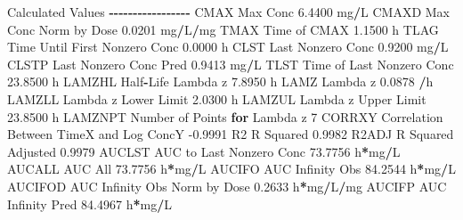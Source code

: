 \documentclass[
  10pt,
]{krantz}
\makeatletter
\newenvironment{Shaded}{\begin{snugshade}}{\end{snugshade}}
\newcommand{\ControlFlowTok}[1]{\textcolor[rgb]{0.13,0.29,0.53}{\textbf{#1}}}
\newcommand{\DecValTok}[1]{\textcolor[rgb]{0.00,0.00,0.81}{#1}}
\newcommand{\FloatTok}[1]{\textcolor[rgb]{0.00,0.00,0.81}{#1}}
\newcommand{\NormalTok}[1]{#1}
\newcommand{\OperatorTok}[1]{\textcolor[rgb]{0.81,0.36,0.00}{\textbf{#1}}}
\newenvironment{kframe}{%
\medskip{}
\setlength{\fboxsep}{.8em}
 \def\at@end@of@kframe{}%
 \ifinner\ifhmode%
  \def\at@end@of@kframe{\end{minipage}}%
  \begin{minipage}{\columnwidth}%
 \fi\fi%
 \def\FrameCommand##1{\hskip\@totalleftmargin \hskip-\fboxsep
 \colorbox{shadecolor}{##1}\hskip-\fboxsep
     \hskip-\linewidth \hskip-\@totalleftmargin \hskip\columnwidth}%
 \MakeFramed {\advance\hsize-\width
   \@totalleftmargin\z@ \linewidth\hsize
   \@setminipage}}%
 {\par\unskip\endMakeFramed%
 \at@end@of@kframe}
\renewenvironment{Shaded}{\begin{kframe}}{\end{kframe}}
\makeatother
\begin{document}
\begin{Shaded}
\begin{Highlighting}[]
\NormalTok{Calculated Values}
\OperatorTok{{-}{-}{-}{-}{-}{-}{-}{-}{-}{-}{-}{-}{-}{-}{-}{-}{-}}
\NormalTok{CMAX       Max Conc                                        }\FloatTok{6.4400}\NormalTok{ mg}\OperatorTok{/}\NormalTok{L}
\NormalTok{CMAXD      Max Conc Norm by Dose                           }\FloatTok{0.0201}\NormalTok{ mg}\OperatorTok{/}\NormalTok{L}\OperatorTok{/}\NormalTok{mg}
\NormalTok{TMAX       Time of CMAX                                    }\FloatTok{1.1500}\NormalTok{ h}
\NormalTok{TLAG       Time Until First Nonzero Conc                   }\FloatTok{0.0000}\NormalTok{ h}
\NormalTok{CLST       Last Nonzero Conc                               }\FloatTok{0.9200}\NormalTok{ mg}\OperatorTok{/}\NormalTok{L}
\NormalTok{CLSTP      Last Nonzero Conc Pred                          }\FloatTok{0.9413}\NormalTok{ mg}\OperatorTok{/}\NormalTok{L}
\NormalTok{TLST       Time of Last Nonzero Conc                      }\FloatTok{23.8500}\NormalTok{ h}
\NormalTok{LAMZHL     Half}\OperatorTok{{-}}\NormalTok{Life Lambda z                              }\FloatTok{7.8950}\NormalTok{ h}
\NormalTok{LAMZ       Lambda z                                        }\FloatTok{0.0878} \OperatorTok{/}\NormalTok{h}
\NormalTok{LAMZLL     Lambda z Lower Limit                            }\FloatTok{2.0300}\NormalTok{ h}
\NormalTok{LAMZUL     Lambda z Upper Limit                           }\FloatTok{23.8500}\NormalTok{ h}
\NormalTok{LAMZNPT    Number of Points }\ControlFlowTok{for}\NormalTok{ Lambda z                   }\DecValTok{7}
\NormalTok{CORRXY     Correlation Between TimeX and Log ConcY        }\FloatTok{{-}0.9991} 
\NormalTok{R2         R Squared                                       }\FloatTok{0.9982} 
\NormalTok{R2ADJ      R Squared Adjusted                              }\FloatTok{0.9979} 
\NormalTok{AUCLST     AUC to Last Nonzero Conc                       }\FloatTok{73.7756}\NormalTok{ h}\OperatorTok{*}\NormalTok{mg}\OperatorTok{/}\NormalTok{L}
\NormalTok{AUCALL     AUC All                                        }\FloatTok{73.7756}\NormalTok{ h}\OperatorTok{*}\NormalTok{mg}\OperatorTok{/}\NormalTok{L}
\NormalTok{AUCIFO     AUC Infinity Obs                               }\FloatTok{84.2544}\NormalTok{ h}\OperatorTok{*}\NormalTok{mg}\OperatorTok{/}\NormalTok{L}
\NormalTok{AUCIFOD    AUC Infinity Obs Norm by Dose                   }\FloatTok{0.2633}\NormalTok{ h}\OperatorTok{*}\NormalTok{mg}\OperatorTok{/}\NormalTok{L}\OperatorTok{/}\NormalTok{mg}
\NormalTok{AUCIFP     AUC Infinity Pred                              }\FloatTok{84.4967}\NormalTok{ h}\OperatorTok{*}\NormalTok{mg}\OperatorTok{/}\NormalTok{L}

\end{Highlighting}
\end{Shaded}
\end{document}
